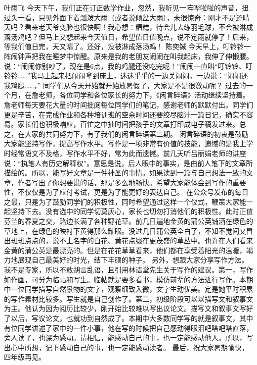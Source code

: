 {}\markdownRendererInterblockSeparator
{}叶雨飞\markdownRendererInterblockSeparator
{}今天下午，我们正在订正数学作业，忽然，我听见一阵哗啦啦的声音，扭过头一看，只见外面下着瓢泼大雨（或者说倾盆大雨），未很惊奇：刚才不是还晴天吗？看来老天爷变脸也很快啊！我心想：糟糕，待会儿去练羽毛球，不会被淋成落汤鸡吧？但马上又想起来今天值日，希望值日值晚点，说不定雨就停了！后来，等我们值日完，天又晴了。还好，没被淋成落汤鸡！\markdownRendererInterblockSeparator
{}\markdownRendererInterblockSeparator
{}陈奕铖\markdownRendererInterblockSeparator
{}今天早上，叮铃铃一阵闹钟声把我在睡梦中惊醒。原来是我的老朋友闹闹在叫我起床，我伸了伸懒腰。说：“闹闹你别吵了，现在是6点，我的鸡腿还没吃完呢！”闹闹一直叫“叮铃铃、叮铃铃……”我马上起来把闹闹拿到床上，迷迷乎乎的一边关闹闹，一边说：“闹闹还我鸡腿……，”\markdownRendererInterblockSeparator
{}\markdownRendererInterblockSeparator
{}同学们从今天开始就开始放暑假了，大家是不是很激动呢？\markdownRendererInterblockSeparator
{}过去的一个月，在詹老师，各位同学和各位家长的努力下，《闲言碎语》活动继续坚持着。詹老师每天要花大量的时间批阅每位同学们的笔记，感谢老师的默默付出。同学们更是辛苦，在完成作业和各种培训班的空余时间还要绞尽脑汁一篇日记，确实不容易。家长们也积极响应，百忙之中抽时间把孩子的文章打印成电子稿发过来。总之，在大家的共同努力下，有了我们的闲言碎语第二期。\markdownRendererInterblockSeparator
{}闲言碎语的初衷是鼓励大家能坚持写作，提高写作水平。写作是一项非常有价值的技能，遗憾的是我上学时经常语文不及格，写作水平不好，常为此而遗憾。前几天听吕丽娟老师的讲座说：“执笔人有历史解释权”。意思是说，后人眼中的事实，是由前人笔下的文章所描绘的。所以，能写好文章是一件神圣的事情。如果读到一篇与自己想法一致的文章，作者写出了你想要说的话，那是多么地畅快。希望大家能体会到写作的重要性，不仅仅是为了应付考试，更是为了能更好的表达自己。\markdownRendererInterblockSeparator
{}在公众号发布的每日之最，只是为了鼓励同学们的积极性，同时希望通过这样一个仪式，鞭策大家能一起坚持下去。没有选中的同学切莫灰心，家长也切勿打消他们的积极性。此时正值芬兰的春夏之交，路边长满了各种野花草。前几日遍地金黄的蒲公英铺洒在绿色的草地上，在绿色的映衬下黄得那么耀眼。没过几日蒲公英全白了，不知不觉间又冒出斑斑点点的，说不上名字的白花、黄花点缀在更茂盛的草丛中。也许在人们看来金黄的蒲公英是最漂亮的。但是在花花草草看来，他们都在享受着阳光的温暖，竭力地展现自己最美好的时光，结下丰硕的种子。\markdownRendererInterblockSeparator
{}另外，想跟大家分享写作方法。我不是专家，所以不敢胡言乱语，且引用林语堂先生关于写作的建议。第一，写作如作画，可分为临帖和写生。临帖就是要多看书，模仿前辈的方法进行写作。本期中一位同学描写自然景物的文字，观察细致入微，文字生动优美。定是她平时积累的写作素材比较多。写生就是自己创作了。第二，初级阶段可以以描写文和叙事文为主。他认为因为阅历比较少，刚开始比较难以写出议论文。描写文和叙事文写好了以后，写议论文，也就功到自然成了。本期中大多数同学写的就是叙事文，其中有位同学讲述了家中的一件小事，他在写的时候把自己感动得眼泪吧嗒吧嗒直落，旁人读了，也深为感动。请相信，能感动自己的事，也一定能感动他人。所以，写出心中所想，记下感动自己的事，也一定能感动读者。\markdownRendererInterblockSeparator
{}最后，祝大家暑期愉快，四年级再见。\relax